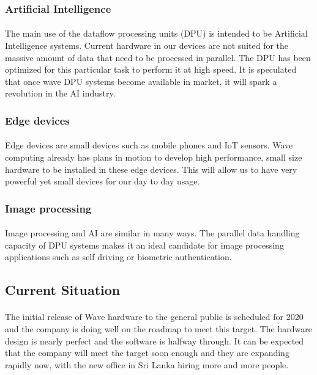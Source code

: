 \subsubsection*{Artificial Intelligence}
\paragraph{}
The main use of the dataflow processing units (DPU) is intended to be Artificial Intelligence systems. Current hardware in our devices are not suited for the massive amount of data that need to be processed in parallel. The DPU has been optimized for this particular task to perform it at high speed. It is speculated that once wave DPU systems become available in market, it will spark a revolution in the AI industry.

\subsubsection*{Edge devices}
\paragraph{}
Edge devices are small devices such as mobile phones and IoT sensors. Wave computing already has plans in motion to develop high performance, small size hardware to be installed in these edge devices. This will allow us to have very powerful yet small devices for our day to day usage.

\subsubsection*{Image processing}
\paragraph{}
Image processing and AI are similar in many ways. The parallel data handling capacity of DPU systems makes it an ideal candidate for image processing applications such as self driving or biometric authentication.


\subsection{Current Situation}
\paragraph{}
The initial release of Wave hardware to the general public is scheduled for 2020 and the company is doing well on the roadmap to meet this target. The hardware design is nearly perfect and the software is halfway through. It can be expected that the company will meet the target soon enough and they are expanding rapidly now, with the new office in Sri Lanka hiring more and more people. 


